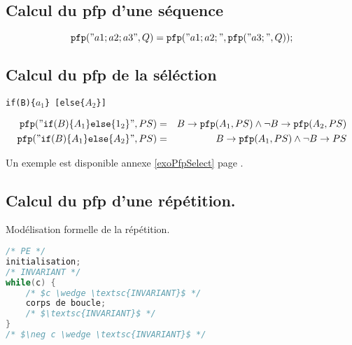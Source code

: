 	\subsection{Calcul du pfp d'une séquence}\label{pfpsequence}
	$$\texttt{pfp}("a1;a2;a3", Q) = \texttt{pfp}("a1;a2;", \texttt{pfp}("a3;", Q));$$
\subsection{Calcul du pfp de la séléction}\label{pfpselection} \begin{center} \texttt{if(B)\{$a_1$\} [else\{$A_2$\}]}
	 \end{center}
\begin{eqnarray*}
	\texttt{pfp}("\texttt{if}(B)\{A_1\}\texttt{else}\{1_2\}", PS) &=&
	B \rightarrow \texttt{pfp}(A_1, PS) \wedge \neg B \rightarrow \texttt{pfp} (A_2, PS)\\
	\texttt{pfp}("\texttt{if}(B)\{A_1\}\texttt{else}\{A_2\}", PS) &=& B \rightarrow \texttt{pfp}(A_1, PS) \wedge \neg B \rightarrow PS 
\end{eqnarray*}

Un exemple est disponible annexe \ref{exoPfpSelect} page \pageref{exoPfpSelect}.

\subsection{Calcul du pfp d'une répétition.}\label{pfpBoucle}
Modélisation formelle de la répétition.
\begin{lstlisting}[language=C]
/* PE */
initialisation;
/* INVARIANT */
while(c) {
	/* $c \wedge \textsc{INVARIANT}$ */
	corps de boucle;
	/* $\textsc{INVARIANT}$ */
}
/* $\neg c \wedge \textsc{INVARIANT}$ */
\end{lstlisting}

